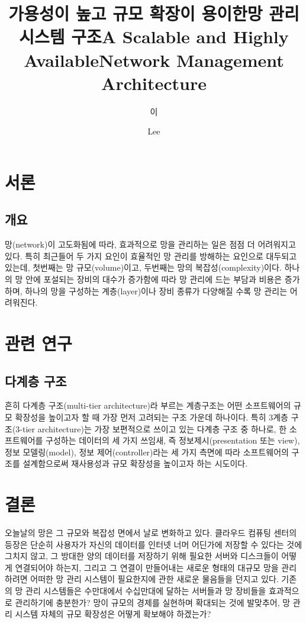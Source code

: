 \documentclass[doctor,korean,final]{cnu-ecs}
\title[korean]{가용성이 높고 규모 확장이 용이한\linebreak 망 관리 시스템 구조}
\title[english]{A Scalable and Highly Available\linebreak Network Management Architecture}
\author[korean] {이}{병 준}
\author[english]{Lee}{Byungjoon}
\begin{document}
\tableofcontents

\listoftables

\listoffigures



\chapter{서론}

\section{개요}

망(network)이 고도화됨에 따라, 효과적으로 망을 관리하는 일은 점점 
더 어려워지고 있다. 
특히 최근들어 두 가지 요인이 효율적인 망 관리를 방해하는 요인으로
대두되고 있는데, 첫번째는 망 규모(volume)이고, 두번째는 망의
복잡성(complexity)이다. 
하나의 망 안에 포설되는 장비의 대수가 증가함에 따라 망 관리에
드는 부담과 비용은 증가하며, 하나의 망을 구성하는 계층(layer)이나 
장비 종류가 다양해질 수록 망 관리는 어려워진다.

\chapter{관련 연구}

\section{다계층 구조}

흔히 다계층 구조(multi-tier architecture)라 부르는 계층구조는 
어떤 소프트웨어의 규모 확장성을 높이고자 할 때 가장 먼저 
고려되는 구조 가운데 하나이다. 
특히 3계층 구조(3-tier architecture)는 가장 보편적으로 쓰이고 있는
다계층 구조 중 하나로, 한 소프트웨어를 구성하는 데이터의 세 가지 쓰임새,
즉 정보제시(presentation 또는 view), 정보 모델링(model), 
정보 제어(controller)라는 세 가지 측면에 따라 소프트웨어의 구조를 설계함으로써
재사용성과 규모 확장성을 높이고자 하는 시도이다.

\chapter{결론}

오늘날의 망은 그 규모와 복잡성 면에서 날로 변화하고 있다.
클라우드 컴퓨팅 센터의 등장은 단순히 사용자가 자신의 데이터를 
인터넷 너머 어딘가에 저장할 수 있다는 것에 그치지 않고,
그 방대한 양의 데이터를 저장하기 위해 필요한 서버와 디스크들이 
어떻게 연결되어야 하는지, 그리고 그 연결이 만들어내는 새로운 형태의
대규모 망을 관리하려면 어떠한 망 관리 시스템이 필요한지에 
관한 새로운 물음들을 던지고 있다. 
기존의 망 관리 시스템들은 수만대에서 수십만대에 달하는
서버들과 망 장비들을 효과적으로 관리하기에 충분한가?
망이 규모의 경제를 실현하며 확대되는 것에 발맞추어,
망 관리 시스템 자체의 규모 확장성은 어떻게 확보해야 하겠는가?
\end{document}
